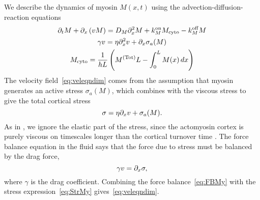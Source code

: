 \documentclass[11pt]{article}
\newcommand{\6}[1]{#1_{\text{6}}}
\newcommand{\3}[1]{#1_{\text{3}}}
\newcommand{\Tot}[1]{#1^\text{(Tot)}}
\newcommand{\My}[1]{#1_M}
\begin{document}
We describe the dynamics of myosin $M(x,t)$ using the advection-diffusion-reaction equations
\begin{subequations}
\label{eq:MyOnly}
\begin{gather}
\Dt M + \Dx \left(v M\right) = D_M \Dx^2 M +\My{\kon}M_\text{cyto} - \My{\koff} M \\
\label{eq:veleqndim}
\gamma v = \eta \Dx^2 v + \Dx \sigma_a(M)\\
M_\text{cyto} = \frac{1}{hL}\left(\Tot{M}L-\int_0^L M(x) \, dx\right)
\end{gather}
\end{subequations}
The velocity field\ \eqref{eq:veleqndim} comes from the assumption that myosin generates an active stress $\sigma_a(M)$, which combines with the viscous stress to give the total cortical stress
\begin{equation}
\label{eq:StrMy}
\sigma = \eta \partial_x{v} + \sigma_a(M).
\end{equation}
As in \cite{bois2011pattern}, we ignore the elastic part of the stress, since the actomyosin cortex is purely viscous on timescales longer than the cortical turnover time \cite{mayer2010anisotropies}. The force balance equation in the fluid says that the force due to stress must be balanced by the drag force, 
\begin{equation}
\label{eq:FBMy}
\gamma v = \partial_x \sigma,
\end{equation}
where $\gamma$ is the drag coefficient. Combining the force balance\ \eqref{eq:FBMy} with the stress expression\ \eqref{eq:StrMy} gives\ \eqref{eq:veleqndim}.
\end{document}
